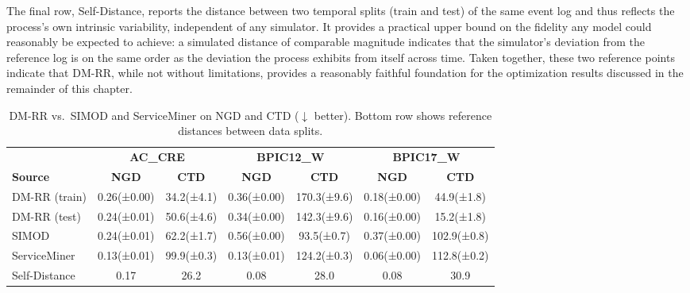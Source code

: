\documentclass[journal,onecolumn]{IEEEtran}
\begin{document}
The final row, Self-Distance, reports the distance between two
temporal splits (train and test) of the same event log and thus reflects the process's
own intrinsic variability, independent of any simulator. It provides
a practical upper bound on the fidelity any model could reasonably be
expected to achieve: a simulated distance of comparable magnitude
indicates that the simulator's deviation from the reference log is on
the same order as the deviation the process exhibits from itself
across time. Taken together, these two reference points indicate that
DM-RR, while not without limitations, provides a reasonably faithful
foundation for the optimization results discussed in the remainder of
this chapter.

\begin{table}[!ht]
\centering\small
\setlength{\tabcolsep}{4pt}
\renewcommand{\arraystretch}{1.05}
\begin{tabular}{l cc cc cc}
\toprule
& \multicolumn{2}{c}{\textbf{AC\_CRE}} & \multicolumn{2}{c}{\textbf{BPIC12\_W}} & \multicolumn{2}{c}{\textbf{BPIC17\_W}} \\
\cmidrule(lr){2-3}\cmidrule(lr){4-5}\cmidrule(lr){6-7}
\textbf{Source} & \textbf{NGD} & \textbf{CTD} & \textbf{NGD} & \textbf{CTD} & \textbf{NGD} & \textbf{CTD} \\
\midrule
DM-RR (train) & 0.26{\tiny(±0.00)} & 34.2{\tiny(±4.1)}  & 0.36{\tiny(±0.00)} & 170.3{\tiny(±9.6)} & 0.18{\tiny(±0.00)} & 44.9{\tiny(±1.8)} \\
DM-RR (test)  & 0.24{\tiny(±0.01)} & 50.6{\tiny(±4.6)}  & 0.34{\tiny(±0.00)} & 142.3{\tiny(±9.6)} & 0.16{\tiny(±0.00)} & 15.2{\tiny(±1.8)} \\
SIMOD         & 0.24{\tiny(±0.01)} & 62.2{\tiny(±1.7)}  & 0.56{\tiny(±0.00)} & 93.5{\tiny(±0.7)}  & 0.37{\tiny(±0.00)} & 102.9{\tiny(±0.8)} \\
ServiceMiner  & 0.13{\tiny(±0.01)} & 99.9{\tiny(±0.3)}  & 0.13{\tiny(±0.01)} & 124.2{\tiny(±0.3)} & 0.06{\tiny(±0.00)} & 112.8{\tiny(±0.2)} \\
\midrule
Self-Distance & 0.17 & 26.2 & 0.08 & 28.0 & 0.08 & 30.9 \\
\bottomrule
\end{tabular}
\caption[Simulator fidelity vs.\ SIMOD and ServiceMiner]{DM-RR vs.\ SIMOD and ServiceMiner
\cite{framework_for_measuring_the_quality_of_business_process_simulation_models}
on NGD and CTD ($\downarrow$ better). Bottom row shows
reference distances between data splits.}
\label{tab:similarity_ref}
\end{table}
\end{document}
